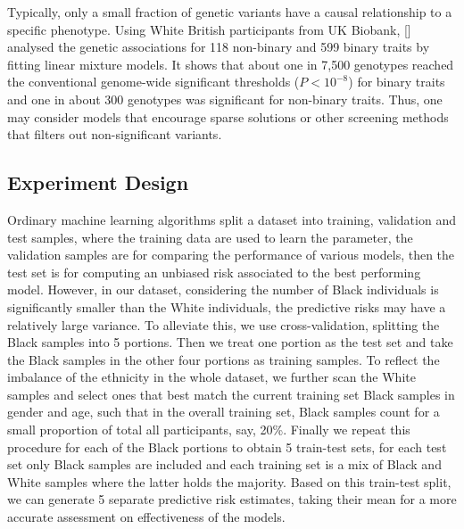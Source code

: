 \documentclass[a4paper,12pt]{article}
\begin{document}
Typically, only a small fraction of genetic variants have a causal relationship to a specific phenotype. Using White British participants from UK Biobank, [\cite{canela2018atlas}] analysed the genetic associations for 118 non-binary and 599 binary traits by fitting linear mixture models. It shows that about one in 7,500 genotypes reached the conventional genome-wide significant thresholds ($P<10^{-8}$) for binary traits and one in about 300 genotypes was significant for non-binary traits. Thus, one may consider models that encourage sparse solutions or other screening methods that filters out non-significant variants.

\subsection{Experiment Design} \label{Experiment Design}
Ordinary machine learning algorithms split a dataset into training, validation and test samples, where the training data are used to learn the parameter, the validation samples are for comparing the performance of various models, then the test set is for computing an unbiased risk associated to the best performing model. However, in our dataset, considering the number of Black individuals is significantly smaller than the White individuals, the predictive risks may have a relatively large variance. To alleviate this, we use cross-validation, splitting the Black samples into 5 portions. Then we treat one portion as the test set and take the Black samples in the other four portions as training samples. To reflect the imbalance of the ethnicity in the whole dataset, we further scan the White samples and select ones that best match the current training set Black samples in gender and age, such that in the overall training set, Black samples count for a small proportion of total all participants, say, 20\%. Finally we repeat this procedure for each of the Black portions to obtain 5 train-test sets, for each test set only Black samples are included and each training set is a mix of Black and White samples where the latter holds the majority. Based on this train-test split, we can generate 5 separate predictive risk estimates, taking their mean for a more accurate assessment on effectiveness of the models. 
\end{document}

